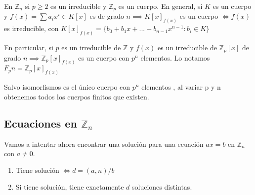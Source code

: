 \documentclass[11pt, a4paper, titlepage]{article}
\providecommand{\ent}{\mathbb{Z}}
\theoremstyle{theorem-style}
\theoremstyle{definition-style}
\theoremstyle{remark-style}
\theoremstyle{example-style}
\begin{document}
En $\ent_n$ si $p \geq 2$ es un irreducible y $\ent_p $ es un cuerpo. En general, si $K$ es un cuerpo y $f(x) = \sum a_i x^i \in K[x]$ es de grado $n \implies K[x]_{f(x)}$
 es un cuerpo $\iff f(x)$ es irreducible, con $K[x]_{f(x)} = \{b_0 +b_1 x + ... + b_{n-1}x^{n-1} :  b_i \in K \}$


En particular, si $p$ es un irreducible de $\ent$ y $f(x)$ es un irreducible de $\ent_p[x]$ de grado $n \implies \ent_p[x]_{f(x)}$ es un cuerpo con $p^n$ elementos. Lo notamos $F_pn = \ent_p[x]_{f(x)}$

Salvo isomorfismos es el único cuerpo con $p^n$ elementos , al variar p y n obtenemos todos los cuerpos finitos que existen.
\subsection{Ecuaciones en $\ent_n$}

Vamos a intentar ahora encontrar una solución para una ecuación $ax = b$ en $\ent_n$ con $a \ne 0$.

\begin{enumerate}
	\item Tiene solución $\iff d =(a,n)/b$
	
	\item Si tiene solución, tiene exactamente $d$ soluciones distintas.
\end{enumerate}
\end{document}
